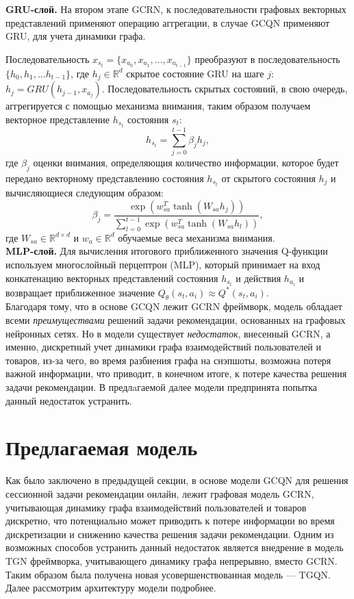 \documentclass{mipt-thesis-ms}
\begin{document}
{\bf GRU-слой.} На втором этапе GCRN, к последовательности графовых векторных представлений применяют операцию аггрегации, в случае GCQN применяют GRU, для учета динамики графа.

Последовательность $x_{s_t} = \{x_{a_0}, x_{a_1}, \dots, x_{a_{t-1}}\}$ преобразуют в последовательность $\{h_0, h_1, \dots h_{t-1}\}$, где $h_j \in \mathbb{R}^d$ скрытое состояние GRU на шаге $j$: $h_j = GRU(h_{j-1}, x_{a_j})$.
Последовательность скрытых состояний, в свою очередь, аггрегируется с помощью механизма внимания, таким образом получаем векторное представление $h_{s_t}$ состояния $s_t$:
$$h_{s_t} = \sum_{j=0}^{t-1} \beta_j h_j,$$
где $\beta_j$ оценки внимания, определяющия количество информации, которое будет передано векторному представлению состояния  $h_{s_t}$ от скрытого состояния $h_j$ и вычисляющиеся следующим образом:
$$\beta_j = \frac{\exp(w_{sa}^T\tanh(W_{sa}h_j))}{\sum_{l=0}^{t-1}\exp(w_{sa}^T\tanh(W_{sa}h_l))},$$
где $W_{sa} \in \mathbb{R}^{d \times d}$ и $w_a \in \mathbb{R}^d$ обучаемые веса механизма внимания.\\

{\bf MLP-слой.} Для вычисления итогового приближенного значения Q-функции используем многослойный перцептрон (MLP), который принимает на вход конкатенацию векторных представлений состояния $h_{s_t}$ и действия $h_{a_i}$ и возвращает приближенное значение $Q_{\theta}(s_t, a_i) \approx Q^*(s_t, a_i)$.\\

Благодаря тому, что в основе GCQN лежит GCRN фреймворк, модель обладает всеми {\it преимуществами} решений задачи рекомендации, основанных на графовых нейронных сетях. Но в модели существует {\it недостаток}, внесенный GCRN, а именно, дискретный учет динамики графа взаимодействий пользователей и товаров, из-за чего, во время разбиения графа на снэпшоты, возможна потеря важной информации, что приводит, в конечном итоге, к потере качества решения задачи рекомендации. В предлaгаемой далее модели предпринята попытка данный недостаток устранить.

\section{Предлагаемая модель}

Как было заключено в предыдущей секции, в основе модели GCQN для решения сессионной задачи рекомендации онлайн, лежит графовая модель GCRN, учитывающая динамику графа взаимодействий пользователей и товаров дискретно, что потенциально может приводить к потере информации во время дискретизации и снижению качества решения задачи рекомендации. Одним из возможных способов устранить данный недостаток является внедрение в модель TGN фреймворка, учитывающего динамику графа непрерывно, вместо GCRN. Таким образом была получена новая усовершенствованная модель --- TGQN. Далее рассмотрим архитектуру модели подробнее.
\\
\end{document}
